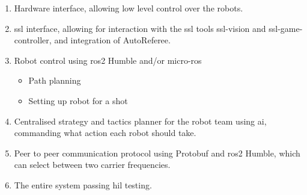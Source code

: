 \begin{enumerate}
    \item Hardware interface, allowing low level control over the robots.
    \item \ac{ssl} interface, allowing for interaction with the \ac{ssl} tools ssl-vision and ssl-game-controller, and integration of AutoReferee.
    \item Robot control using \ac{ros2} Humble and/or micro-\acs{ros}
    \begin{itemize}
        \item Path planning
        \item Setting up robot for a shot
    \end{itemize}
    \item Centralised strategy and tactics planner for the robot team using \ac{ai}, commanding what action each robot should take.
    \item Peer to peer communication protocol using Protobuf and \ac{ros2} Humble, which can select between two carrier frequencies. 
    \item The entire system passing \ac{hil} testing.
\end{enumerate}

